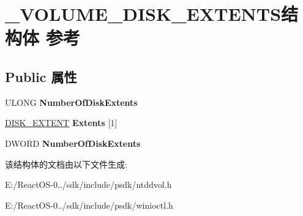 \hypertarget{struct___v_o_l_u_m_e___d_i_s_k___e_x_t_e_n_t_s}{}\section{\+\_\+\+V\+O\+L\+U\+M\+E\+\_\+\+D\+I\+S\+K\+\_\+\+E\+X\+T\+E\+N\+T\+S结构体 参考}
\label{struct___v_o_l_u_m_e___d_i_s_k___e_x_t_e_n_t_s}
\subsection*{Public 属性}
\begin{DoxyCompactItemize}
\item 
\mbox{\label{struct___v_o_l_u_m_e___d_i_s_k___e_x_t_e_n_t_s_adbbfa7553d498f8045a8113b95c9df99}} 
U\+L\+O\+NG {\bfseries Number\+Of\+Disk\+Extents}
\item 
\mbox{\label{struct___v_o_l_u_m_e___d_i_s_k___e_x_t_e_n_t_s_a7b1c62d8aba4a5264d751d29d05bf562}} 
\hyperlink{struct___d_i_s_k___e_x_t_e_n_t}{D\+I\+S\+K\+\_\+\+E\+X\+T\+E\+NT} {\bfseries Extents} \mbox{[}1\mbox{]}
\item 
\mbox{\label{struct___v_o_l_u_m_e___d_i_s_k___e_x_t_e_n_t_s_adbbfa7553d498f8045a8113b95c9df99}} 
D\+W\+O\+RD {\bfseries Number\+Of\+Disk\+Extents}
\end{DoxyCompactItemize}


该结构体的文档由以下文件生成\+:\begin{DoxyCompactItemize}
\item 
E\+:/\+React\+O\+S-\/0../sdk/include/psdk/ntddvol.\+h\item 
E\+:/\+React\+O\+S-\/0../sdk/include/psdk/winioctl.\+h\end{DoxyCompactItemize}
